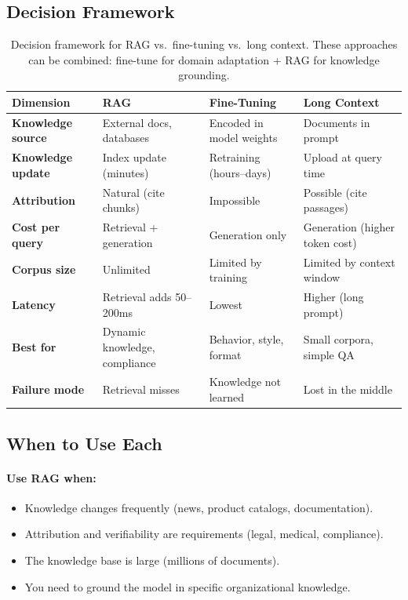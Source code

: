 \subsection{Decision Framework}

\begin{table}[H]
\centering
\small
\begin{tabularx}{\textwidth}{@{}l X X X@{}}
\toprule
\textbf{Dimension} & \textbf{RAG} & \textbf{Fine-Tuning} & \textbf{Long Context} \\
\midrule
\textbf{Knowledge source} & External docs, databases & Encoded in model weights & Documents in prompt \\
\textbf{Knowledge update} & Index update (minutes) & Retraining (hours--days) & Upload at query time \\
\textbf{Attribution} & Natural (cite chunks) & Impossible & Possible (cite passages) \\
\textbf{Cost per query} & Retrieval + generation & Generation only & Generation (higher token cost) \\
\textbf{Corpus size} & Unlimited & Limited by training & Limited by context window \\
\textbf{Latency} & Retrieval adds 50--200ms & Lowest & Higher (long prompt) \\
\textbf{Best for} & Dynamic knowledge, compliance & Behavior, style, format & Small corpora, simple QA \\
\textbf{Failure mode} & Retrieval misses & Knowledge not learned & Lost in the middle \\
\bottomrule
\end{tabularx}
\caption{Decision framework for RAG vs.\ fine-tuning vs.\ long context.
These approaches can be combined: fine-tune for domain adaptation + RAG for
knowledge grounding.}
\label{tab:rag-vs-ft}
\end{table}

\subsection{When to Use Each}

\paragraph{Use RAG when:}
\begin{itemize}
    \item Knowledge changes frequently (news, product catalogs, documentation).
    \item Attribution and verifiability are requirements (legal, medical, compliance).
    \item The knowledge base is large (millions of documents).
    \item You need to ground the model in specific organizational knowledge.
\end{itemize}


